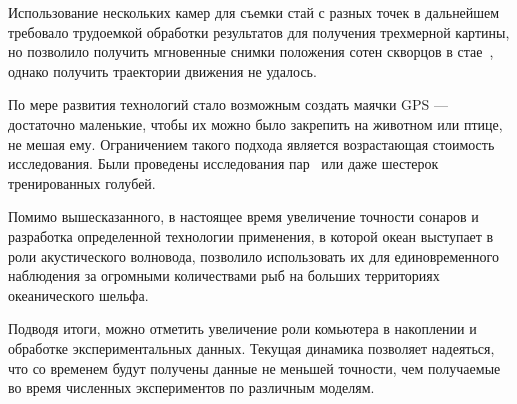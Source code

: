 	Использование нескольких камер для съемки стай с разных точек в дальнейшем требовало трудоемкой обработки результатов для получения трехмерной картины, но позволило получить мгновенные снимки положения сотен скворцов в стае~\cite{ballerini2008}, однако получить траектории движения не удалось.

	По мере развития технологий стало возможным создать маячки GPS --- достаточно маленькие, чтобы их можно было закрепить на животном или птице, не мешая ему. Ограничением такого подхода является возрастающая стоимость исследования. Были проведены исследования пар~\cite{biro2006,nagy2010} или даже шестерок~\cite{dellariccia2008} тренированных голубей.

	Помимо вышесказанного, в настоящее время увеличение точности сонаров и разработка определенной технологии применения, в которой океан выступает в роли акустического волновода, позволило использовать их для единовременного наблюдения за огромными количествами рыб на больших территориях океанического шельфа.~\cite{makris2006}

	Подводя итоги, можно отметить увеличение роли комьютера в накоплении и обработке экспериментальных данных. Текущая динамика позволяет надеяться, что со временем будут получены данные не меньшей точности, чем получаемые во время численных экспериментов по различным моделям.
